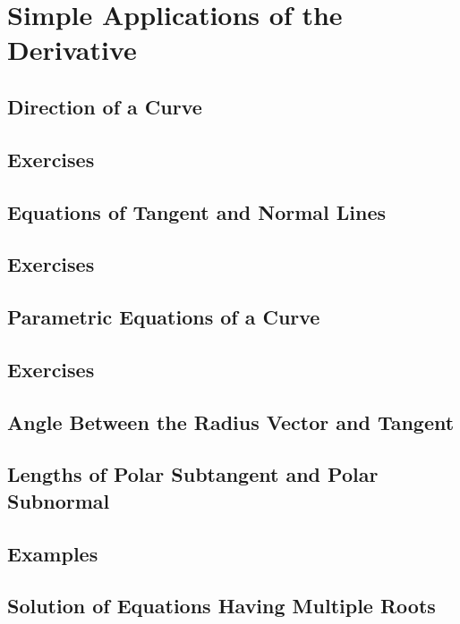\chapter{Simple Applications of the Derivative}
\label{ch:06}

\section{Direction of a Curve}
\label{sec:06:01}

\section{Exercises}
\label{sec:06:02}

\section{Equations of Tangent and Normal Lines}
\label{sec:06:03}

\section{Exercises}
\label{sec:06:04}

\section{Parametric Equations of a Curve}
\label{sec:06:05}

\section{Exercises}
\label{sec:06:06}

\section{Angle Between the Radius Vector and Tangent}
\label{sec:06:07}

\section{Lengths of Polar Subtangent and Polar Subnormal}
\label{sec:06:08}

\section{Examples}
\label{sec:06:09}

\section{Solution of Equations Having Multiple Roots}
\label{sec:06:10}

